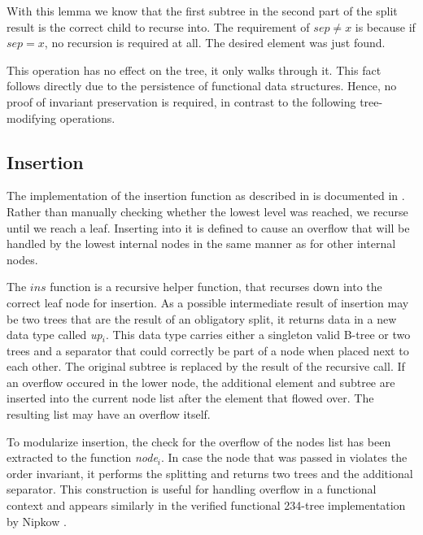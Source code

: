 With this lemma we know that the first subtree
in the second part of the split result
is the correct child to recurse into.
The requirement of $sep \neq x$ is because if $sep = x$,
no recursion is required at all.
The desired element was just found.

This operation has no effect on the tree, it only walks through it.
This fact follows directly due to the persistence of functional data structures.
Hence, no proof of invariant preservation is required,
in contrast to the following tree-modifying operations.

\subsection{Insertion}
\label{sec:abs-ins}



The implementation of the insertion function
as described in  is documented in .
Rather than manually checking whether the lowest level was reached,
we recurse until we reach a leaf.
Inserting into it is defined to cause an overflow that will be handled
by the lowest internal nodes in the same manner as for other internal nodes.

The $ins$ function is a recursive helper function,
that recurses down into the correct leaf node for insertion.
As a possible intermediate result of insertion
may be two trees that are the result of an obligatory split,
it returns data in a new data type called \textit{up}$_i$.
This data type carries either a singleton valid B-tree or two trees and a separator
that could correctly be part of a node when placed next to each other.
The original subtree is replaced by
the result of the recursive call.
If an overflow occured in the lower node, the additional element and
subtree are inserted into the current node list
after the element that flowed over.
The resulting list may have an overflow itself.

To modularize insertion, the check for the overflow of
the nodes list has been
extracted to the function \textit{node}$_i$.
In case the node that was passed in violates the order invariant,
it performs the splitting and returns two trees and the additional separator.
This construction is useful for handling overflow
in a functional context and appears similarly in the
verified functional 234-tree implementation by Nipkow \parencite{DBLP:conf/itp/Nipkow16}.

